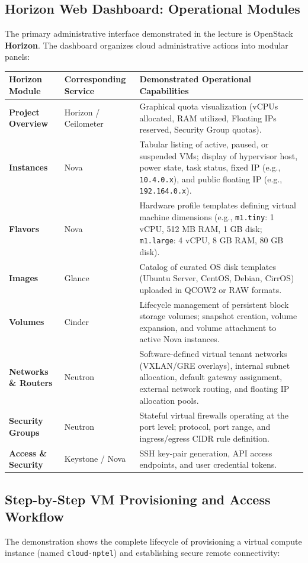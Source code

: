 \subsection{Horizon Web Dashboard: Operational Modules}
The primary administrative interface demonstrated in the lecture is OpenStack \textbf{Horizon}. The dashboard organizes cloud administrative actions into modular panels:

\begin{center}
\begin{tabularx}{\textwidth}{>{\bfseries}l p{3.2cm} X}
\toprule
Horizon Module & Corresponding Service & Demonstrated Operational Capabilities\\
\midrule
Project Overview & Horizon / Ceilometer & Graphical quota visualization (vCPUs allocated, RAM utilized, Floating IPs reserved, Security Group quotas).\\
Instances & Nova & Tabular listing of active, paused, or suspended VMs; display of hypervisor host, power state, task status, fixed IP (e.g., \texttt{10.4.0.x}), and public floating IP (e.g., \texttt{192.164.0.x}).\\
Flavors & Nova & Hardware profile templates defining virtual machine dimensions (e.g., \texttt{m1.tiny}: 1 vCPU, 512 MB RAM, 1 GB disk; \texttt{m1.large}: 4 vCPU, 8 GB RAM, 80 GB disk).\\
Images & Glance & Catalog of curated OS disk templates (Ubuntu Server, CentOS, Debian, CirrOS) uploaded in QCOW2 or RAW formats.\\
Volumes & Cinder & Lifecycle management of persistent block storage volumes; snapshot creation, volume expansion, and volume attachment to active Nova instances.\\
Networks \& Routers & Neutron & Software-defined virtual tenant networks (VXLAN/GRE overlays), internal subnet allocation, default gateway assignment, external network routing, and floating IP allocation pools.\\
Security Groups & Neutron & Stateful virtual firewalls operating at the port level; protocol, port range, and ingress/egress CIDR rule definition.\\
Access \& Security & Keystone / Nova & SSH key-pair generation, API access endpoints, and user credential tokens.\\
\bottomrule
\end{tabularx}
\end{center}

\subsection{Step-by-Step VM Provisioning and Access Workflow}
The demonstration shows the complete lifecycle of provisioning a virtual compute instance (named \texttt{cloud-nptel}) and establishing secure remote connectivity:

